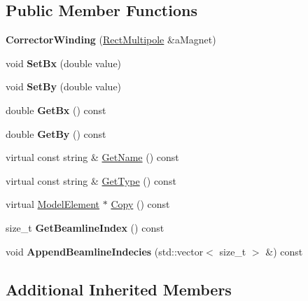\subsection*{Public Member Functions}
\begin{DoxyCompactItemize}
\item 
\mbox{\label{classCorrectorWinding_a0133eff52cac0b50d79314d9b02e8b96}} 
{\bfseries Corrector\+Winding} (\hyperlink{classRectMultipole}{Rect\+Multipole} \&a\+Magnet)
\item 
\mbox{\label{classCorrectorWinding_a8a678f90a648c17177b4d71336a56f33}} 
void {\bfseries Set\+Bx} (double value)
\item 
\mbox{\label{classCorrectorWinding_adf6a894ef2ed17dfab64d91c1275145a}} 
void {\bfseries Set\+By} (double value)
\item 
\mbox{\label{classCorrectorWinding_a822bb73822518fda0f6865974eb25731}} 
double {\bfseries Get\+Bx} () const
\item 
\mbox{\label{classCorrectorWinding_a8b8920d4ce236592966c5c75837fef77}} 
double {\bfseries Get\+By} () const
\item 
virtual const string \& \hyperlink{classCorrectorWinding_afb8a04514388b2b9b0e640b606f8f47c}{Get\+Name} () const
\item 
virtual const string \& \hyperlink{classCorrectorWinding_a299195a163660e3bd13e15437a91dd91}{Get\+Type} () const
\item 
virtual \hyperlink{classModelElement}{Model\+Element} $\ast$ \hyperlink{classCorrectorWinding_adb8096ea0f8eb3743747fada685cc62c}{Copy} () const
\item 
\mbox{\label{classCorrectorWinding_a1b7f26174afd6d35ba9e6d1e13dd4643}} 
size\+\_\+t {\bfseries Get\+Beamline\+Index} () const
\item 
\mbox{\label{classCorrectorWinding_ad3f271bc5190e0540895b4fadf4583a1}} 
void {\bfseries Append\+Beamline\+Indecies} (std\+::vector$<$ size\+\_\+t $>$ \&) const
\end{DoxyCompactItemize}
\subsection*{Additional Inherited Members}


